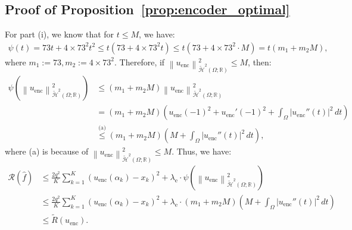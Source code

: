 \documentclass{article}
\def\encs{u_\textrm{enc}}
\def\enclamb{\lambda_\textrm{e}}
\newcommand{\norm}[1]{\left\lVert#1\right\rVert}
\newcommand{\lp}[1]{{L}^{#1}\left(\Omega; \mathbb{R}\right)}
\newcommand{\hiltilde}[1]{\widetilde{\mathcal{H}}^{#1}\left(\Omega;\mathbb{R}\right)}
\newcommand{\lec}[2]{\stackrel{\text{#1}}{#2}}
\begin{document}
\subsection{Proof of Proposition~\ref{prop:encoder_optimal}}\label{app:proof_cor_optimal_enc}
For part (i), we know that for $t \leqslant M$, we have:
\begin{align}
    \psi(t)=73t + 4\times73^2t^2\leqslant t(73 + 4\times73^2t) \leqslant t(73 + 4\times73^2\cdot M) = t(m_1 + m_2M),
\end{align}
where $m_1:=73, m_2:=4\times73^2$. Therefore, if $\norm{\encs}^2_{\hiltilde{2}} \leqslant M$, then:
\begin{align}
    \psi(\norm{\encs}^2_{\hiltilde{2}}) &\leqslant (m_1 + m_2M)\norm{\encs}^2_{\hiltilde{2}} \nonumber \\
    &= (m_1 + m_2M)\left(\encs(-1)^2 + \encs'(-1)^2 + \int_\Omega |\encs''(t)|^2\,dt\right)
    \nonumber \\
    &\lec{(a)}{\leqslant} (m_1 + m_2M)\left(M + \int_\Omega |\encs''(t)|^2\,dt\right),
\end{align}
where (a) is because of $\norm{\encs}^2_{\hiltilde{2}} \leqslant M$. Thus, we have:
\begin{align}
    \mathcal{R}(\hat{f}) &\leqslant \frac{2q^2}{K} \sum^K_{k=1} (\encs(\alpha_k) - x_k)^2 + \enclamb \cdot \psi\left(\norm{\encs}^2_{\hiltilde{2}}\right) \nonumber \\
    &\leqslant \frac{2q^2}{K} \sum^K_{k=1} (\encs(\alpha_k) - x_k)^2 + \enclamb \cdot (m_1 + m_2M)\left(M + \int_\Omega |\encs''(t)|^2\,dt\right) \nonumber \\
    &\leqslant \widetilde{R}(\encs).
\end{align}
\end{document}

